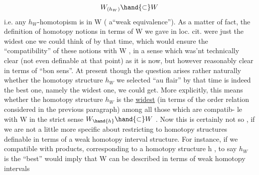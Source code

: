 \[ W_{(h_W)} \hand{\ensuremath{\subset}} W \]
i.e. any $h_W$-homotopism is in W ( a``weak equivalence''). As a matter of fact,
the definition of homotopy notions in terms of W we gave in loc. cit.
were just the widest one we could think of by that time, which would
ensure the ``compatibility'' of these notions with W , in a sense which
was'nt technically clear (not even definable at that point) as it is now,
but however reasonably clear in terms of  ``bon sens''. At present though
the question arises rather naturally whether the homotopy structure $h_W$
we selected ``au flair'' by that time is indeed the best one, namely the
widest one, we could get. More explicitly, this means whether the
homotopy structure $h_W$ is the \uline{widest} (in terms of the  order relation
considered in the previous paragraph) among all those which are compatib-%
le with W in the strict sense $W_{\hand{h}} \hand{\ensuremath{\subset}} W$ . Now this is certainly not so , if
we are not a little more specific about  restricting to homotopy
structures definable in terms of a weak homotopy interval structure.
For instance, if we  
 compatible with products,
corresponding to a homotopy structure h , to say $h_W$ is the ``best'' would
 imply that W  can be described in terms of weak homotopy intervals

